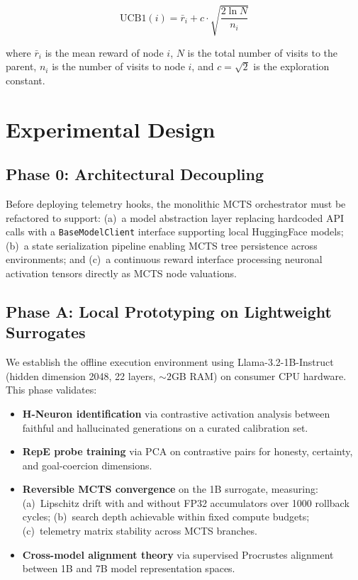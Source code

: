 \documentclass{article}
\begin{document}
\begin{equation}
\text{UCB1}(i) = \bar{r}_i + c \cdot \sqrt{\frac{2 \ln N}{n_i}}
\label{eq:ucb1}
\end{equation}

where $\bar{r}_i$ is the mean reward of node $i$, $N$ is the total number of visits to the parent, $n_i$ is the number of visits to node $i$, and $c = \sqrt{2}$ is the exploration constant.

\section{Experimental Design}

\subsection{Phase 0: Architectural Decoupling}

Before deploying telemetry hooks, the monolithic MCTS orchestrator must be refactored to support: (a)~a model abstraction layer replacing hardcoded API calls with a \texttt{BaseModelClient} interface supporting local HuggingFace models; (b)~a state serialization pipeline enabling MCTS tree persistence across environments; and (c)~a continuous reward interface processing neuronal activation tensors directly as MCTS node valuations.

\subsection{Phase A: Local Prototyping on Lightweight Surrogates}

We establish the offline execution environment using Llama-3.2-1B-Instruct (hidden dimension 2048, 22 layers, ${\sim}2$GB RAM) on consumer CPU hardware. This phase validates:

\begin{itemize}[leftmargin=*]
    \item \textbf{H-Neuron identification} via contrastive activation analysis between faithful and hallucinated generations on a curated calibration set.
    \item \textbf{RepE probe training} via PCA on contrastive pairs for honesty, certainty, and goal-coercion dimensions.
    \item \textbf{Reversible MCTS convergence} on the 1B surrogate, measuring: (a)~Lipschitz drift with and without FP32 accumulators over 1000 rollback cycles; (b)~search depth achievable within fixed compute budgets; (c)~telemetry matrix stability across MCTS branches.
    \item \textbf{Cross-model alignment theory} via supervised Procrustes alignment between 1B and 7B model representation spaces.
\end{itemize}
\end{document}
